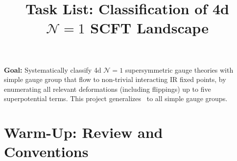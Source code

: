 \documentclass[12pt]{article}
\title{Task List: Classification of 4d $\mathcal{N}=1$ SCFT Landscape}
\author{}
\date{}
\begin{document}
\maketitle

\noindent
\textbf{Goal:} Systematically classify 4d $\mathcal{N}=1$ supersymmetric gauge theories with simple gauge group that flow to non-trivial interacting IR fixed points, by enumerating all relevant deformations (including flippings) up to five superpotential terms.
This project generalizes~\cite{CMNS} to all simple gauge groups.

\bigskip

\section{Warm-Up: Review and Conventions}
\end{document}
